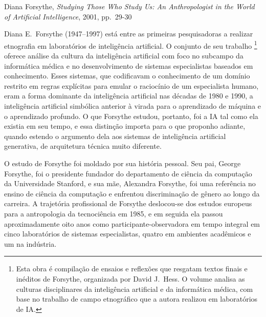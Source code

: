 %
{Diana Forsythe, \textit{Studying Those Who Study Us: An Anthropologist in the World of Artificial Intelligence}, 2001, pp.~29-30}

Diana E.~Forsythe (1947--1997) está entre as primeiras pesquisadoras a realizar etnografia em laboratórios de inteligência artificial. O conjunto de seu trabalho \parencite{Forsythe2001}\footnote{Esta obra é compilação de ensaios e reflexões que resgatam textos finais e inéditos de Forsythe, organizada por David J.~Hess. O volume analisa as culturas disciplinares da inteligência artificial e da informática médica, com base no trabalho de campo etnográfico que a autora realizou em laboratórios de IA.} oferece análise da cultura da inteligência artificial com foco no subcampo da informática médica e no desenvolvimento de sistemas especialistas baseados em conhecimento. Esses sistemas, que codificavam o conhecimento de um domínio restrito em regras explícitas para emular o raciocínio de um especialista humano, eram a forma dominante da inteligência artificial nas décadas de 1980 e 1990, a inteligência artificial simbólica anterior à virada para o aprendizado de máquina e o aprendizado profundo. O que Forsythe estudou, portanto, foi a IA tal como ela existia em seu tempo, e essa distinção importa para o que proponho adiante, quando estendo o argumento dela aos sistemas de inteligência artificial generativa, de arquitetura técnica muito diferente.

O estudo de Forsythe foi moldado por sua história pessoal. Seu pai, George Forsythe, foi o presidente fundador do departamento de ciência da computação da Universidade Stanford, e sua mãe, Alexandra Forsythe, foi uma referência no ensino de ciência da computação e enfrentou discriminação de gênero ao longo da carreira. A trajetória profissional de Forsythe deslocou-se dos estudos europeus para a antropologia da tecnociência em 1985, e em seguida ela passou aproximadamente oito anos como participante-observadora em tempo integral em cinco laboratórios de sistemas especialistas, quatro em ambientes acadêmicos e um na indústria.

